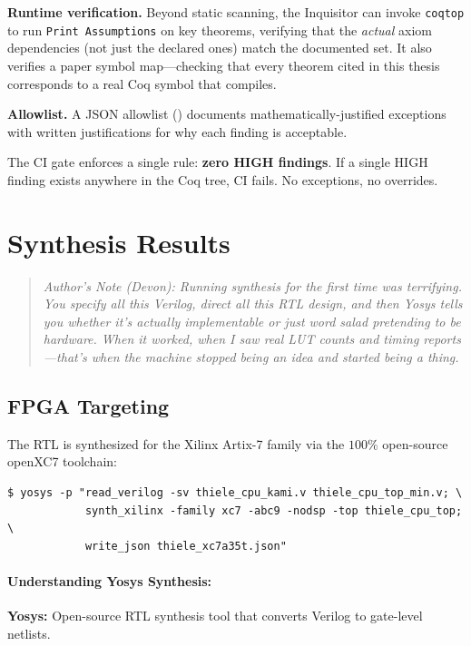 \textbf{Runtime verification.} Beyond static scanning, the Inquisitor can invoke \texttt{coqtop} to run \texttt{Print Assumptions} on key theorems, verifying that the \textit{actual} axiom dependencies (not just the declared ones) match the documented set. It also verifies a paper symbol map---checking that every theorem cited in this thesis corresponds to a real Coq symbol that compiles.

\textbf{Allowlist.} A JSON allowlist () documents mathematically-justified exceptions with written justifications for why each finding is acceptable.

The CI gate enforces a single rule: \textbf{zero HIGH findings}. If a single HIGH finding exists anywhere in the Coq tree, CI fails. No exceptions, no overrides.

\section{Synthesis Results}

\begin{quote}
\textit{Author's Note (Devon): Running synthesis for the first time was terrifying. You specify all this Verilog, direct all this RTL design, and then Yosys tells you whether it's actually implementable or just word salad pretending to be hardware. When it worked, when I saw real LUT counts and timing reports---that's when the machine stopped being an idea and started being a thing.}
\end{quote}

\subsection{FPGA Targeting}

The RTL is synthesized for the Xilinx Artix-7 family via the
$100\%$ open-source openXC7 toolchain:
\begin{lstlisting}
$ yosys -p "read_verilog -sv thiele_cpu_kami.v thiele_cpu_top_min.v; \
            synth_xilinx -family xc7 -abc9 -nodsp -top thiele_cpu_top; \
            write_json thiele_xc7a35t.json"
\end{lstlisting}

\paragraph{Understanding Yosys Synthesis:}
\textbf{Yosys:} Open-source RTL synthesis tool that converts Verilog to gate-level netlists.

